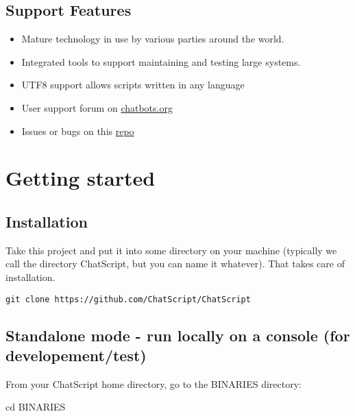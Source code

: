 \documentclass[]{article}
\newenvironment{Shaded}{}{}
\newcommand{\BuiltInTok}[1]{#1}
\newcommand{\NormalTok}[1]{#1}
\providecommand{\tightlist}{%
  \setlength{\itemsep}{0pt}\setlength{\parskip}{0pt}}
\begin{document}
\subsection{Support Features}\label{support-features}

\begin{itemize}
\tightlist
\item
  Mature technology in use by various parties around the world.
\item
  Integrated tools to support maintaining and testing large systems.
\item
  UTF8 support allows scripts written in any language
\item
  User support forum on
  \href{https://www.chatbots.org/ai_zone/viewforum/44/}{chatbots.org}
\item
  Issues or bugs on this
  \href{https://github.com/bwilcox-1234/ChatScript/issues}{repo}
\end{itemize}

\section{Getting started}\label{getting-started}

\subsection{Installation}\label{installation}

Take this project and put it into some directory on your machine
(typically we call the directory ChatScript, but you can name it
whatever). That takes care of installation.

\begin{verbatim}
git clone https://github.com/ChatScript/ChatScript
\end{verbatim}

\subsection{Standalone mode - run locally on a console (for
developement/test)}\label{standalone-mode---run-locally-on-a-console-for-developementtest}

From your ChatScript home directory, go to the BINARIES directory:

\begin{Shaded}
\begin{Highlighting}[]
\BuiltInTok{cd}\NormalTok{ BINARIES}
\end{Highlighting}
\end{Shaded}
\end{document}
